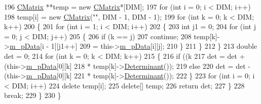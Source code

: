 \begin{DoxyCode}
196                     \hyperlink{classCMatrix}{CMatrix} **temp = \textcolor{keyword}{new} \hyperlink{classCMatrix}{CMatrix}*[DIM];
197                     \textcolor{keywordflow}{for} (\textcolor{keywordtype}{int} i = 0; i < DIM; i++)
198                         temp[i] = \textcolor{keyword}{new} \hyperlink{classCMatrix_a720aa6a48296f4414ac7f9021bc420c4}{CMatrix}(\textcolor{stringliteral}{""}, DIM - 1, DIM - 1);
199                     \textcolor{keywordflow}{for} (\textcolor{keywordtype}{int} k = 0; k < DIM; k++)
200                     \{
201                         \textcolor{keywordflow}{for} (\textcolor{keywordtype}{int} i = 1; i < DIM; i++)
202                         \{
203                             \textcolor{keywordtype}{int} j1 = 0;
204                             \textcolor{keywordflow}{for} (\textcolor{keywordtype}{int} j = 0; j < DIM; j++)
205                             \{
206                                 \textcolor{keywordflow}{if} (k == j)
207                                     \textcolor{keywordflow}{continue};
208                                 temp[k]->\hyperlink{classCMatrix_ab0f18d68cad9b6d750d05a96b60a759d}{m\_pData}[i - 1][j1++]
209                                         = this->\hyperlink{classCMatrix_ab0f18d68cad9b6d750d05a96b60a759d}{m\_pData}[i][j];
210                             \}
211                         \}
212                     \}
213                     \textcolor{keywordtype}{double} det = 0;
214                     \textcolor{keywordflow}{for} (\textcolor{keywordtype}{int} k = 0; k < DIM; k++)
215                     \{
216                         \textcolor{keywordflow}{if} ((k %
217                             det = det + (this->\hyperlink{classCMatrix_ab0f18d68cad9b6d750d05a96b60a759d}{m\_pData}[0][k]
218                                     * temp[k]->\hyperlink{classCMatrix_a865ff8f610be372e666fbf24d5b73a3a}{Determinant}());
219                         \textcolor{keywordflow}{else}
220                             det = det - (this->\hyperlink{classCMatrix_ab0f18d68cad9b6d750d05a96b60a759d}{m\_pData}[0][k]
221                                     * temp[k]->\hyperlink{classCMatrix_a865ff8f610be372e666fbf24d5b73a3a}{Determinant}());
222                     \}
223                     \textcolor{keywordflow}{for} (\textcolor{keywordtype}{int} i = 0; i < DIM; i++)
224                         \textcolor{keyword}{delete} temp[i];
225                     \textcolor{keyword}{delete}[] temp;
226                     \textcolor{keywordflow}{return} det;
227                 \}
228                     \textcolor{keywordflow}{break};
229             \}
230         \}
\end{DoxyCode}



